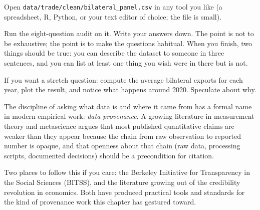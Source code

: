 \documentclass[
  letterpaper,
  11pt,
  twoside,
  openany]{scrbook}
\begin{document}
\begin{tcolorbox}[enhanced jigsaw, arc=.35mm, bottomrule=.15mm, bottomtitle=1mm, breakable, colback=white, colbacktitle=quarto-callout-tip-color!10!white, colframe=quarto-callout-tip-color-frame, coltitle=black, left=2mm, leftrule=.75mm, opacityback=0, opacitybacktitle=0.6, rightrule=.15mm, title=\textcolor{quarto-callout-tip-color}{\faLightbulb}\hspace{0.5em}{Try this}, titlerule=0mm, toprule=.15mm, toptitle=1mm]

Open \texttt{data/trade/clean/bilateral\_panel.csv} in any tool you like
(a spreadsheet, R, Python, or your text editor of choice; the file is
small).

Run the eight-question audit on it. Write your answers down. The point
is not to be exhaustive; the point is to make the questions habitual.
When you finish, two things should be true: you can describe the dataset
to someone in three sentences, and you can list at least one thing you
wish were in there but is not.

If you want a stretch question: compute the average bilateral exports
for each year, plot the result, and notice what happens around 2020.
Speculate about why.

\end{tcolorbox}

\begin{tcolorbox}[enhanced jigsaw, arc=.35mm, bottomrule=.15mm, bottomtitle=1mm, breakable, colback=white, colbacktitle=quarto-callout-important-color!10!white, colframe=quarto-callout-important-color-frame, coltitle=black, left=2mm, leftrule=.75mm, opacityback=0, opacitybacktitle=0.6, rightrule=.15mm, title=\textcolor{quarto-callout-important-color}{\faExclamation}\hspace{0.5em}{Frontier note}, titlerule=0mm, toprule=.15mm, toptitle=1mm]

The discipline of asking what data is and where it came from has a
formal name in modern empirical work: \emph{data provenance}. A growing
literature in measurement theory and metascience argues that most
published quantitative claims are weaker than they appear because the
chain from raw observation to reported number is opaque, and that
openness about that chain (raw data, processing scripts, documented
decisions) should be a precondition for citation.

Two places to follow this if you care: the Berkeley Initiative for
Transparency in the Social Sciences (BITSS), and the literature growing
out of the credibility revolution in economics. Both have produced
practical tools and standards for the kind of provenance work this
chapter has gestured toward.

\end{tcolorbox}
\end{document}
